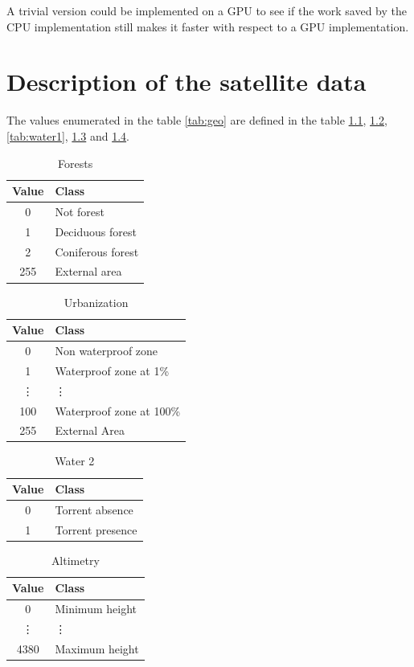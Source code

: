 \documentclass[Lau]{sapthesis} %
\def\section{\chapter}
\begin{document}
A trivial version could be implemented on a GPU to see if the work saved by the
CPU implementation still makes it faster with respect to a GPU implementation.

\appendix

\section{Description of the satellite data}\label{sec:desc}

The values enumerated in the table \ref{tab:geo} are defined in the table
\ref{tab:forest}, \ref{tab:urbanization}, \ref{tab:water1}, \ref{tab:water2} and
\ref{tab:altimetry}.

\begin{table}[ht]
\centering
\begin{tabular}{|c|l|}
\hline
\textbf{Value} & \textbf{Class}\\
\hline
0 & Not forest\\
1 & Deciduous forest\\
2 & Coniferous forest\\
255 & External area\\
\hline
\end{tabular}
\caption{Forests}
\label{tab:forest}
\end{table}
%
\begin{table}[ht]
\centering
\begin{tabular}{|c|l|}
\hline
\textbf{Value} & \textbf{Class}\\
\hline
0 & Non waterproof zone\\
1 & Waterproof zone at 1\%\\
\vdots & \vdots\\
100 & Waterproof zone at 100\%\\
255 & External Area\\
\hline
\end{tabular}
\caption{Urbanization}
\label{tab:urbanization}
\end{table}
%
\begin{table}[ht]
\centering
\begin{tabular}{|c|l|}
\hline
\textbf{Value} & \textbf{Class}\\
\hline
0 & Torrent absence\\
1 & Torrent presence\\
\hline
\end{tabular}
\caption{Water 2}
\label{tab:water2}
\end{table}
%
\begin{table}[ht]
\centering
\begin{tabular}{|c|l|}
\hline
\textbf{Value} & \textbf{Class}\\
\hline
0 & Minimum height\\
\vdots & \vdots\\
4380 & Maximum height\\
\hline
\end{tabular}
\caption{Altimetry}
\label{tab:altimetry}
\end{table}
\end{document}
